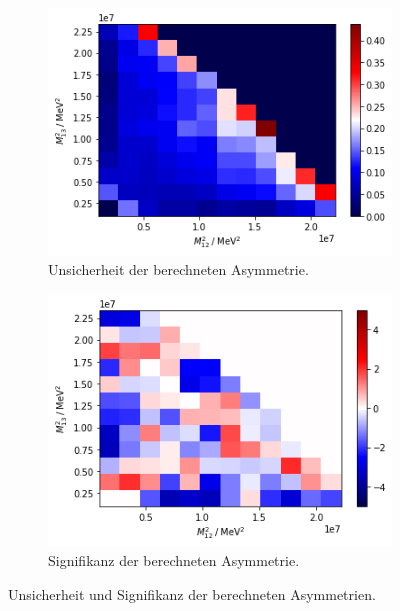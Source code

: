 \begin{figure}
  \begin{subfigure}{0.5\textwidth}
    \centering
    \includegraphics[width=\linewidth]{plots/real_data_uncertainty_asymmetrie_dalitz.png}
    \caption{Unsicherheit der berechneten Asymmetrie.}
    \label{fig:locSigma}
  \end{subfigure}%
  \begin{subfigure}{0.5\textwidth}
    \centering
    \includegraphics[width=\linewidth]{plots/real_data_significance_dalitz.png}
    \caption{Signifikanz der berechneten Asymmetrie.}
    \label{fig:locSigni}
  \end{subfigure}%
  \label{fig:sigundsig}
  \caption{Unsicherheit und Signifikanz der berechneten Asymmetrien.}
\end{figure}

